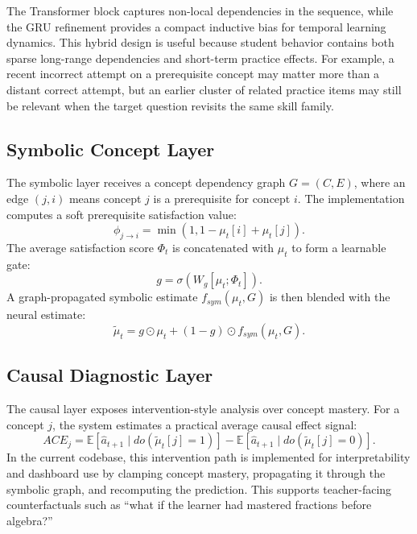 \documentclass[conference]{IEEEtran}
\begin{document}
The Transformer block captures non-local dependencies in the sequence, while the GRU refinement provides a compact inductive bias for temporal learning dynamics. This hybrid design is useful because student behavior contains both sparse long-range dependencies and short-term practice effects. For example, a recent incorrect attempt on a prerequisite concept may matter more than a distant correct attempt, but an earlier cluster of related practice items may still be relevant when the target question revisits the same skill family.

\subsection{Symbolic Concept Layer}
The symbolic layer receives a concept dependency graph $G=(C,E)$, where an edge $(j,i)$ means concept $j$ is a prerequisite for concept $i$. The implementation computes a soft prerequisite satisfaction value:
\begin{equation}
\phi_{j\rightarrow i}= \min(1, 1-\mu_t[i]+\mu_t[j]).
\end{equation}
The average satisfaction score $\Phi_t$ is concatenated with $\mu_t$ to form a learnable gate:
\begin{equation}
g=\sigma(W_g[\mu_t;\Phi_t]).
\end{equation}
A graph-propagated symbolic estimate $f_{sym}(\mu_t,G)$ is then blended with the neural estimate:
\begin{equation}
\tilde{\mu}_t=g\odot\mu_t+(1-g)\odot f_{sym}(\mu_t,G).
\end{equation}

\subsection{Causal Diagnostic Layer}
The causal layer exposes intervention-style analysis over concept mastery. For a concept $j$, the system estimates a practical average causal effect signal:
\begin{equation}
ACE_j = \mathbb{E}[\hat{a}_{t+1}\mid do(\tilde{\mu}_t[j]=1)] -
\mathbb{E}[\hat{a}_{t+1}\mid do(\tilde{\mu}_t[j]=0)].
\end{equation}
In the current codebase, this intervention path is implemented for interpretability and dashboard use by clamping concept mastery, propagating it through the symbolic graph, and recomputing the prediction. This supports teacher-facing counterfactuals such as ``what if the learner had mastered fractions before algebra?''
\end{document}
